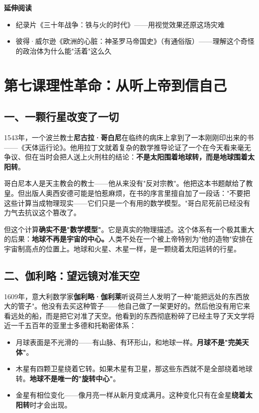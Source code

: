 \documentclass[a4paper,12pt]{ctexart}
\begin{document}
\vspace{0.3cm}
\textcolor{blue!70!black}{\textbf{延伸阅读}}
\begin{itemize}
  \item 纪录片《三十年战争：铁与火的时代》——用视觉效果还原这场灾难
  \item 彼得·威尔逊《欧洲的心脏：神圣罗马帝国史》（有通俗版）——理解这个奇怪的政治体为什么能"活着"这么久
\end{itemize}

\newpage

\section{\textcolor{orange!80!black}{第七课\quad 理性革命：从听上帝到信自己}}

\subsection*{一、一颗行星改变了一切}

1543年，一个波兰教士\textbf{尼古拉·哥白尼}在临终的病床上拿到了一本刚刚印出来的书——《天体运行论》。他用拉丁文就着复杂的数学推导论证了一个在今天看来毫无争议、但在当时会把人送上火刑柱的结论：\textbf{不是太阳围着地球转，而是地球围着太阳转}。

哥白尼本人是天主教会的教士——他从来没有"反对宗教"。他把这本书题献给了教皇。但出版人奥西安德可能是怕惹麻烦，在书的序言里擅自加了一段话："不要把这些计算当成物理现实——它们只是一个有用的数学模型。"哥白尼死前已经没有力气去抗议这个篡改了。

但这个计算\textbf{确实不是"数学模型"}。它是真实的物理描述。这个体系有一个极其重大的后果：\textbf{地球不再是宇宙的中心。}人类不处在一个被上帝特别为"他的造物"安排在宇宙制高点的位置上。地球和火星、木星一样，是一颗绕着太阳运转的行星。

\subsection*{二、伽利略：望远镜对准天空}

1609年，意大利数学家\textbf{伽利略·伽利莱}听说荷兰人发明了一种"能把远处的东西放大的管子"。他没有去买这种管子——他自己做了一架更好的。然后他没有用它来看远处的船，而是把它对准了天空。他看到的东西彻底粉碎了已经主导了天文学将近一千五百年的亚里士多德和托勒密体系：

\begin{itemize}
  \item 月球表面是不光滑的——有山脉、有环形山，和地球一样。\textbf{月球不是"完美天体"}。
  \item 木星有四颗卫星绕着它转。如果木星有卫星，那这些东西就不是全部绕着地球转。\textbf{地球不是唯一的"旋转中心"}。
  \item 金星有相位变化——像月亮一样从新月变成满月。这种变化只有在金星\textbf{绕着太阳转}时才会出现。
\end{itemize}
\end{document}
